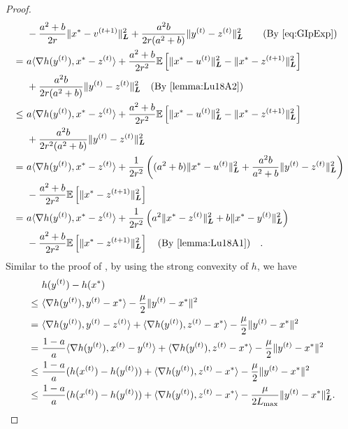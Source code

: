 \begin{proof}
\begin{equation}
\begin{split}
    &- \frac{a^2+b}{2r} \| x^* - v^{(t+1)} \|_{\bL}^2 + \frac{a^2b}{2r(a^2+b)} \| y^{(t)} - z^{(t)} \|_{\bL}^2 \quad \text{(By \eqref{eq:GIpExp})} \\
    {=}~& a \langle \nabla h( y^{(t)} ), x^* - z^{(t)} \rangle + \frac{a^2+b}{2r^2} \mE \left[ \| x^* - u^{(t)} \|_{\bL}^2 - \| x^* - z^{(t+1)} \|_{\bL}^2 \right] \\
    &+ \frac{a^2b}{2r(a^2+b)} \| y^{(t)} - z^{(t)} \|_{\bL}^2 \text{(By \autoref{lemma:Lu18A2})} \\
    \leq~& a \langle \nabla h( y^{(t)} ), x^* - z^{(t)} \rangle + \frac{a^2+b}{2r^2} \mE \left[ \| x^* - u^{(t)} \|_{\bL}^2 - \| x^* - z^{(t+1)} \|_{\bL}^2 \right] \\
    &+ \frac{a^2b}{2r^2(a^2+b)} \| y^{(t)} - z^{(t)} \|_{\bL}^2 \\
    =~& a \langle \nabla h( y^{(t)} ), x^* - z^{(t)} \rangle + \frac{1}{2r^2} \left( (a^2 +b ) \| x^* - u^{(t)} \|_{\bL}^2 + \frac{a^2b}{a^2+b}  \| y^{(t)} - z^{(t)} \|_{\bL}^2 \right) \\
    &- \frac{a^2 + b}{2r^2} \mE \left[  \| x^* - z^{(t+1)} \|_{\bL}^2 \right] \\
    =~& a \langle \nabla h( y^{(t)} ), x^* - z^{(t)} \rangle + \frac{1}{2r^2} \left( a^2 \| x^* - z^{(t)} \|_{\bL}^2 + b \| x^* - y^{(t)} \|_{\bL}^2 \right) \\
    &- \frac{a^2 + b}{2r^2} \mE \left[  \| x^* - z^{(t+1)} \|_{\bL}^2 \right] \text{(By \autoref{lemma:Lu18A1})}. 
\end{split}
\end{equation}
Similar to the proof of \citet[Theorem~3.1]{Lu18}, by using the strong convexity of $h$, we have
\begin{align*}
    &h( y^{(t)} ) - h(x^*) \\
    ~\leq~& \langle \nabla h( y^{(t)} ), y^{(t)} - x^*  \rangle - \frac{\mu}{2} \| y^{(t)} - x^* \|^2 \\
    ~=~& \langle \nabla h( y^{(t)} ), y^{(t)} - z^{(t)} \rangle + \langle \nabla h( y^{(t)} ), z^{(t)} - x^* \rangle - \frac{\mu}{2} \| y^{(t)} - x^* \|^2 \\
    ~=~&  \frac{1-a}{a}\langle \nabla h( y^{(t)} ), x^{(t)} - y^{(t)} \rangle + \langle \nabla h( y^{(t)} ), z^{(t)} - x^* \rangle - \frac{\mu}{2} \| y^{(t)} - x^* \|^2 \\
    ~\leq~ & \frac{1-a}{a}( h( x^{(t)} ) - h(y^{(t)}) ) + \langle \nabla h( y^{(t)} ), z^{(t)} - x^* \rangle - \frac{\mu}{2} \| y^{(t)} - x^* \|^2  \\
    ~\leq~ & \frac{1-a}{a}( h( x^{(t)} ) - h(y^{(t)}) ) + \langle \nabla h( y^{(t)} ), z^{(t)} - x^* \rangle - \frac{\mu}{2L_{\max}} \| y^{(t)} - x^* \|^2_{\bL}.

\end{align*}
\end{proof}
